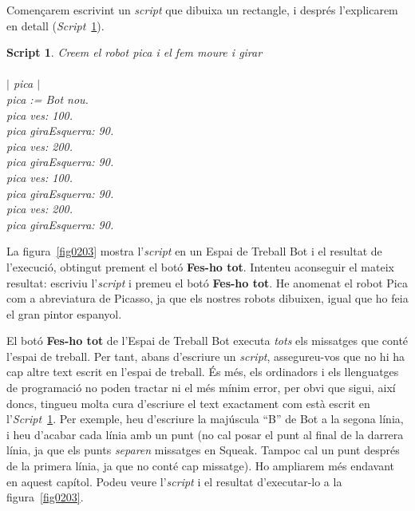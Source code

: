 Començarem escrivint un \emph{script} que dibuixa un rectangle, i després l'explicarem en detall (\emph{Script}~\ref{scr2-1}). 

\newtheorem{script}{Script}[chapter]
\begin{script} Creem el robot pica i el fem moure i girar
\noindent
\textsf{\upshape
\\
\\$|$ pica $|$\\
pica := Bot nou.\\
pica ves: 100.\\
pica giraEsquerra: 90.\\
pica ves: 200.\\
pica giraEsquerra: 90.\\
pica ves: 100.\\
pica giraEsquerra: 90.\\
pica ves: 200.\\
pica giraEsquerra: 90.\\
}
\label{scr2-1}
\end{script}

La figura~\ref{fig0203} mostra l'\emph{script} en un \textsf{Espai de Treball Bot} i el resultat de l'execució, obtingut prement el botó \textbf{Fes-ho tot}. Intenteu aconseguir el mateix resultat: escriviu l'\emph{script} i premeu el botó \textbf{Fes-ho tot}. He anomenat el robot \textsf{Pica} com a abreviatura de Picasso, ja que els nostres robots dibuixen, igual que ho feia el gran pintor espanyol.

El botó \textbf{Fes-ho tot} de l'\textsf{Espai de Treball Bot} executa \emph{tots} els missatges que conté l'espai de treball. Per tant, abans d'escriure un \emph{script}, assegureu-vos que no hi ha cap altre text escrit en l'espai de treball. És més, els ordinadors  i els llenguatges de programació no poden tractar ni el més mínim error, per obvi que sigui, així doncs, tingueu molta cura d'escriure el text exactament com està escrit en  l'\emph{Script}~\ref{scr2-1}. Per exemple, heu d'escriure la majúscula ``B'' de \textsf{Bot} a la segona línia, i heu d'acabar cada línia amb un punt (no cal posar el punt al final de la darrera línia, ja que els punts \emph{separen} missatges en Squeak. Tampoc cal un punt després de la primera línia, ja que no conté cap missatge). Ho ampliarem més endavant en aquest capítol. Podeu veure l'\emph{script} i el resultat d'executar-lo a la figura~\ref{fig0203}. 

